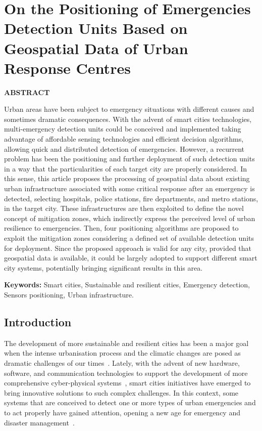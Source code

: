 \chapter{On the Positioning of Emergencies Detection Units Based on Geospatial Data of Urban Response Centres}\label{cap:posicionamento}

\begin{refsection}

\textbf{ABSTRACT}

Urban areas have been subject to emergency situations with different causes and sometimes dramatic consequences. With the advent of smart cities technologies, multi-emergency detection units could be conceived and implemented taking advantage of affordable sensing technologies and efficient decision algorithms, allowing quick and distributed detection of emergencies. However, a recurrent problem has been the positioning and further deployment of such detection units in a way that the particularities of each target city are properly considered. In this sense, this article proposes the processing of geospatial data about existing urban infrastructure associated with some critical response after an emergency is detected, selecting hospitals, police stations, fire departments, and metro stations, in the target city. These infrastructures are then exploited to define the novel concept of mitigation zones, which indirectly express the perceived level of urban resilience to emergencies. Then, four positioning algorithms are proposed to exploit the mitigation zones considering a defined set of available detection units for deployment. Since the proposed approach is valid for any city, provided that geospatial data is available, it could be largely adopted to support different smart city systems, potentially bringing significant results in this area.

\textbf{Keywords:} Smart cities, Sustainable and resilient cities, Emergency detection, Sensors positioning, Urban infrastructure.

\section{Introduction}\label{c2:introduction}

The development of more sustainable and resilient cities has been a major goal when the intense urbanisation process and the climatic changes are posed as dramatic challenges of our times~\cite{surveycity3}. Lately, with the advent of new hardware, software, and communication technologies to support the development of more comprehensive cyber-physical systems~\cite{surveycityPlatform1,surveycityPlatform2,surveycityPlatform3}, smart cities initiatives have emerged to bring innovative solutions to such complex challenges. In this context, some systems that are conceived to detect one or more types of urban emergencies and to act properly have gained attention, opening a new age for emergency and disaster management~\cite{surveyEmergencies}. 


\end{refsection}
